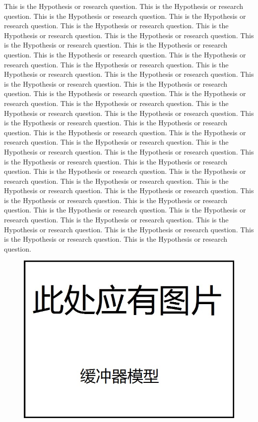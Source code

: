 \documentclass[12pt]{article}
\begin{document}
\begin{flushleft}
This is the Hypothesis or research question. This is the Hypothesis or research question. This is the Hypothesis or research question. This is the Hypothesis or research question. This is the Hypothesis or research question. This is the Hypothesis or research question. This is the Hypothesis or research question. This is the Hypothesis or research question. This is the Hypothesis or research question. This is the Hypothesis or research question. This is the Hypothesis or research question. This is the Hypothesis or research question. This is the Hypothesis or research question. This is the Hypothesis or research question. This is the Hypothesis or research question. This is the Hypothesis or research question. This is the Hypothesis or research question. This is the Hypothesis or research question. This is the Hypothesis or research question. This is the Hypothesis or research question. This is the Hypothesis or research question. This is the Hypothesis or research question. This is the Hypothesis or research question. This is the Hypothesis or research question. This is the Hypothesis or research question. This is the Hypothesis or research question. This is the Hypothesis or research question. This is the Hypothesis or research question. This is the Hypothesis or research question. This is the Hypothesis or research question. This is the Hypothesis or research question. This is the Hypothesis or research question. This is the Hypothesis or research question. This is the Hypothesis or research question. This is the Hypothesis or research question. This is the Hypothesis or research question. This is the Hypothesis or research question. This is the Hypothesis or research question. This is the Hypothesis or research question. This is the Hypothesis or research question. This is the Hypothesis or research question. This is the Hypothesis or research question. This is the Hypothesis or research question. This is the Hypothesis or research question. 
\begin{figure}[h!]
	\begin{center}
		\includegraphics[scale = 0.6]{buffer.jpg}

\end{center}
\end{figure}
\end{flushleft}
\end{document}
